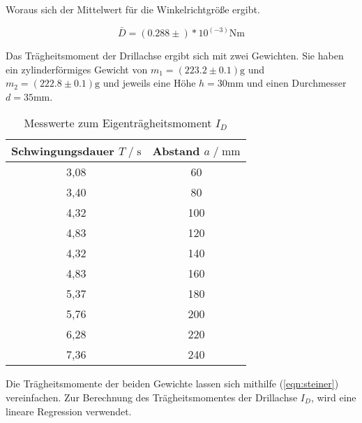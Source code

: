 Woraus sich der Mittelwert für die Winkelrichtgröße ergibt.

\begin{equation}
  \bar D = (0.288\pm) *10^(-3)\si{\newton\meter}
\end{equation}

Das Trägheitsmoment der Drillachse ergibt sich mit zwei Gewichten.
Sie haben ein zylinderförmiges Gewicht von $m_1 = (223.2 \pm 0.1) \text{g}$ und $m_2 = (222.8 \pm 0.1) \text{g}$ und jeweils eine
Höhe $h=30\si{\milli\meter}$ und einen Durchmesser $d=35\si{\milli\meter}$.

\begin{table}
  \centering
   \caption{Messwerte zum Eigenträgheitsmoment $I_D$}
   \label{tab:eigentraegheitmess}
   \begin{tabular}{c c}
       \toprule
       Schwingungsdauer $ T \;/\; \si{\second}$ & Abstand $a \;/\; \si{\milli\meter}$ \\
       \midrule
       3,08 & 60 \\
       3,40 & 80 \\
       4,32 & 100 \\
       4,83 & 120 \\
       4,32 & 140 \\
       4,83 & 160 \\
       5,37 & 180 \\
       5,76 & 200 \\
       6,28 & 220 \\
       7,36 & 240 \\
       \bottomrule
   \end{tabular}
\end{table}





Die Trägheitsmomente der beiden Gewichte lassen sich mithilfe (\autoref{eqn:steiner}) vereinfachen. Zur Berechnung
des Trägheitsmomentes der Drillachse $I_D$, wird eine lineare Regression verwendet.


